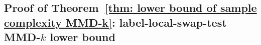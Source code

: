 \documentclass[aps,prx,reprint,superscriptaddress,amsmath,amssymb,longbibliography,floatfix]{revtex4-2}
\theoremstyle{plain}
\theoremstyle{definition}
\theoremstyle{remark}
\begin{document}



\subsection{Proof of Theorem~\ref{thm: lower bound of sample complexity MMD-k}: label-local-swap-test MMD-$k$ lower bound}
\label{appsub: MMD-k proof of lower bound}
\end{document}
